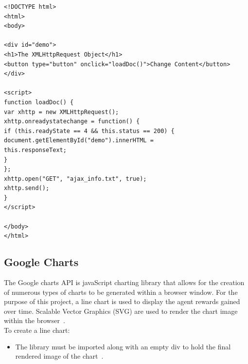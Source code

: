 \begin{verbatim}
<!DOCTYPE html>
<html>
<body>

<div id="demo">
<h1>The XMLHttpRequest Object</h1>
<button type="button" onclick="loadDoc()">Change Content</button>
</div>

<script>
function loadDoc() {
var xhttp = new XMLHttpRequest();
xhttp.onreadystatechange = function() {
if (this.readyState == 4 && this.status == 200) {
document.getElementById("demo").innerHTML =
this.responseText;
}
};
xhttp.open("GET", "ajax_info.txt", true);
xhttp.send();
}
</script>

</body>
</html>
\end{verbatim}


\subsection{Google Charts}
The Google charts API is javaScript charting library that allows for the creation of numerous types of charts to be generated within a browser window. For the purpose of this project, a line chart is used to display the agent rewards gained over time. Scalable Vector Graphics (SVG) are used to render the chart image within the browser~\cite{GoogleLineChart:online}.\\
To create a line chart:
\begin{itemize}
	\item The library must be imported along with an empty div to hold the final rendered image of the chart~\cite{GoogleLineChart:online}.

\end{itemize}

